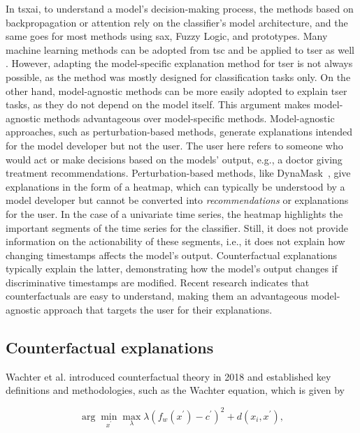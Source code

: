 In \gls{tsxai}, to understand a model's decision-making process, the methods based on backpropagation or attention rely on the classifier's model architecture, and the same goes for most methods using \gls{sax}, Fuzzy Logic, and prototypes. 
Many machine learning methods can be adopted from \gls{tsc} and be applied to \gls{tser} as well \cite{mohammadi_foumani_deep_2024}. However, adapting the model-specific explanation method for \gls{tser} is not always possible, as the method was mostly designed for classification tasks only.
On the other hand, model-agnostic methods can be more easily adopted to explain \gls{tser} tasks, as they do not depend on the model itself. This argument makes model-agnostic methods advantageous over model-specific methods. Model-agnostic approaches, such as perturbation-based methods, generate explanations intended for the model developer but not the user. The user here refers to someone who would act or make decisions based on the models' output, e.g., a doctor giving treatment recommendations. Perturbation-based methods, like DynaMask~\cite{crabbe_explaining_2021}, give explanations in the form of a heatmap, which can typically be understood by a model developer but cannot be converted into \textit{recommendations} or explanations for the user. In the case of a univariate time series, the heatmap highlights the important segments of the time series for the classifier. Still, it does not provide information on the actionability of these segments, i.e., it does not explain how changing timestamps affects the model's output. Counterfactual explanations typically explain the latter, demonstrating how the model's output changes if discriminative timestamps are modified. Recent research indicates \cite{miller_explanation_2019} that counterfactuals are easy to understand, making them an advantageous model-agnostic approach that targets the user for their explanations.

\subsection{Counterfactual explanations}
\label{sec:related-work:counterfactual_explanations}
Wachter et al. \cite{wachter_counterfactual_2018} introduced counterfactual theory in 2018 and established key definitions and methodologies, such as the Wachter equation, which is given by 

\begin{equation} \label{eq:wachter}
\arg \min _{x^{\prime}} \max _{\lambda} \lambda\left(f_{w}\left(x^{\prime}\right)-c^{\prime}\right)^{2}+d\left(x_{i}, x^{\prime}\right),
\end{equation}


